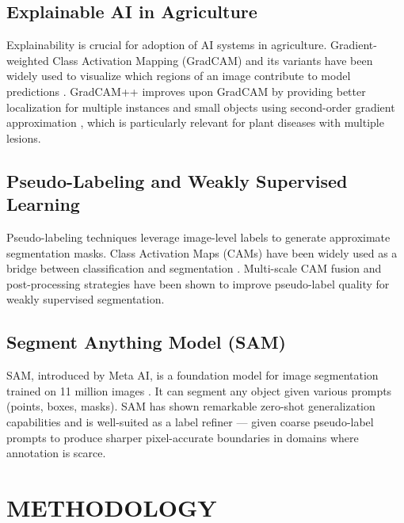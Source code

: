 \documentclass[10pt,a4paper]{article}
\begin{document}
\subsection{Explainable AI in Agriculture}

Explainability is crucial for adoption of AI systems in agriculture. Gradient-weighted Class Activation Mapping (GradCAM) and its variants have been widely used to visualize which regions of an image contribute to model predictions \cite{selvaraju2017grad}. GradCAM++ improves upon GradCAM by providing better localization for multiple instances and small objects using second-order gradient approximation \cite{chattopadhay2018grad}, which is particularly relevant for plant diseases with multiple lesions.

\subsection{Pseudo-Labeling and Weakly Supervised Learning}

Pseudo-labeling techniques leverage image-level labels to generate approximate segmentation masks. Class Activation Maps (CAMs) have been widely used as a bridge between classification and segmentation \cite{barbedo2019plant}. Multi-scale CAM fusion and post-processing strategies have been shown to improve pseudo-label quality for weakly supervised segmentation.

\subsection{Segment Anything Model (SAM)}

SAM, introduced by Meta AI, is a foundation model for image segmentation trained on 11 million images \cite{kirillov2023segment}. It can segment any object given various prompts (points, boxes, masks). SAM has shown remarkable zero-shot generalization capabilities and is well-suited as a label refiner --- given coarse pseudo-label prompts to produce sharper pixel-accurate boundaries in domains where annotation is scarce.

\section{METHODOLOGY}
\end{document}
